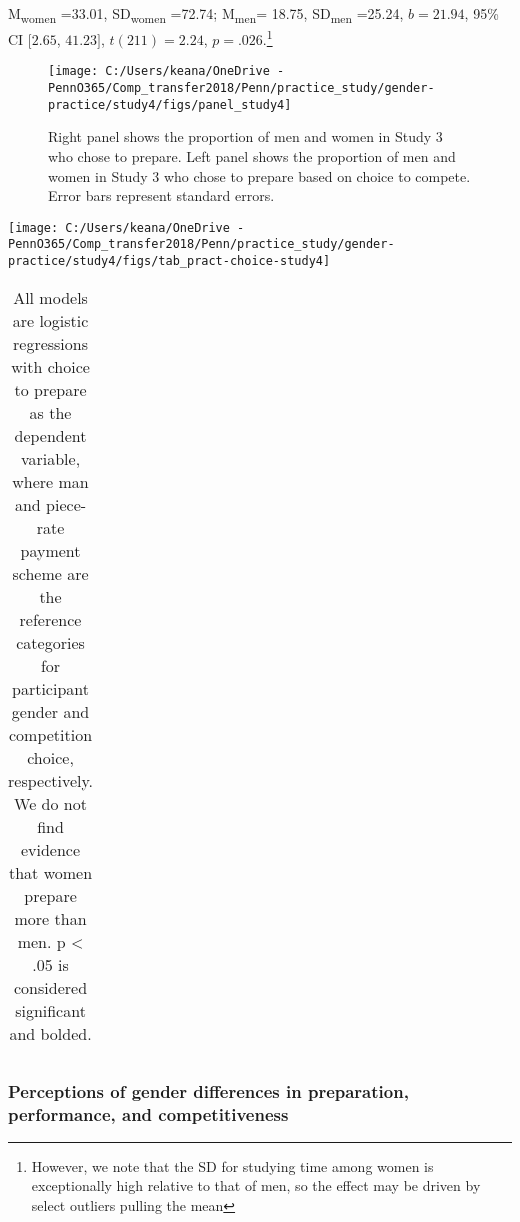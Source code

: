 \documentclass[letterpaper, nobind]{templates/ociamthesis}
\begin{document}
M\textsubscript{women} =33.01, SD\textsubscript{women} =72.74; M\textsubscript{men}= 18.75, SD\textsubscript{men} =25.24, \(b = 21.94\), 95\% CI \([2.65\), \(41.23]\), \(t(211) = 2.24\), \(p = .026\).\footnote{However, we note that the SD for studying time among women is exceptionally high relative to that of men, so the effect may be driven by select outliers pulling the mean}

\begin{figure}

{\centering \texttt{[image: C:/Users/keana/OneDrive - PennO365/Comp\_transfer2018/Penn/practice\_study/gender-practice/study4/figs/panel\_study4]} 

}

\caption{Right panel shows the proportion of men and women in Study 3 who chose to prepare. Left panel shows the proportion of men and women in Study 3 who chose to prepare based on choice to compete. Error bars represent standard errors.}\label{fig:panel-study4}
\end{figure}

\newpage

\begin{center}\texttt{[image: C:/Users/keana/OneDrive - PennO365/Comp\_transfer2018/Penn/practice\_study/gender-practice/study4/figs/tab\_pract-choice-study4]} \end{center}

\begin{table}[ht]
\centering
\begingroup\fontsize{0.1pt}{0.1pt}\selectfont
\begin{tabular}{r}
   \\ 
 \end{tabular}
\endgroup
\caption{All models are logistic regressions with choice to prepare as the dependent variable, where man and piece-rate payment scheme are the reference categories for participant gender and competition choice, respectively. We do not find evidence that women prepare more than men. p < .05 is considered significant and bolded.} 
\label{tab:tab-pract-choice-study4}
\end{table}

\hypertarget{perceptions-of-gender-differences-in-preparation-performance-and-competitiveness-3}{%
\subsubsection{Perceptions of gender differences in preparation, performance, and competitiveness}\label{perceptions-of-gender-differences-in-preparation-performance-and-competitiveness-3}}
\end{document}
